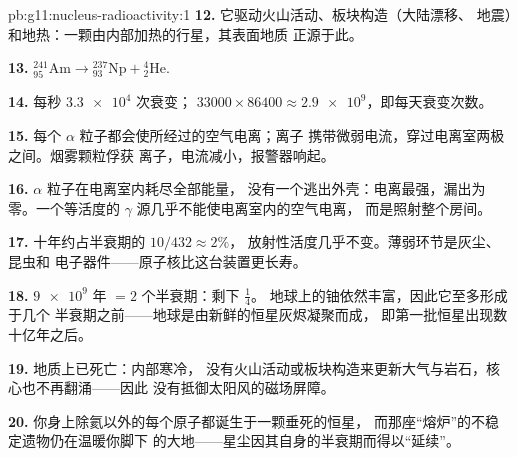 \begin{solution}{pb:g11:nucleus-radioactivity:1}
\textbf{12.} 它驱动火山活动、板块构造（大陆漂移、
地震）和地热：一颗由内部加热的行星，其表面地质
正源于此。

\textbf{13.} ${}^{241}_{95}\mathrm{Am} \to {}^{237}_{93}\mathrm{Np} +
{}^{4}_{2}\mathrm{He}$.

\textbf{14.} 每秒 $\num{3.3e4}$ 次衰变；
$\num{33000} \times 86400 \approx \num{2.9e9}$，即每天衰变次数。

\textbf{15.} 每个 $\alpha$ 粒子都会使所经过的空气电离；离子
携带微弱电流，穿过电离室两极之间。烟雾颗粒俘获
离子，电流减小，报警器响起。

\textbf{16.} $\alpha$ 粒子在电离室内耗尽全部能量，
没有一个逃出外壳：电离最强，漏出为零。一个等活度的 $\gamma$
源几乎不能使电离室内的空气电离，
而是照射整个房间。

\textbf{17.} 十年约占半衰期的 $10/432 \approx 2\%$，
放射性活度几乎不变。薄弱环节是灰尘、昆虫和
电子器件——原子核比这台装置更长寿。

\textbf{18.} $\num{9e9}$ 年 $= 2$ 个半衰期：剩下 $\frac14$。
地球上的铀依然丰富，因此它至多形成于几个
半衰期之前——地球是由新鲜的恒星灰烬凝聚而成，
即第一批恒星出现数十亿年之后。

\textbf{19.} 地质上已死亡：内部寒冷，
没有火山活动或板块构造来更新大气与岩石，核心也不再翻涌——因此
没有抵御太阳风的磁场屏障。

\textbf{20.} 你身上除氦以外的每个原子都诞生于一颗垂死的恒星，
而那座“熔炉”的不稳定遗物仍在温暖你脚下
的大地——星尘因其自身的半衰期而得以“延续”。
\end{solution}
